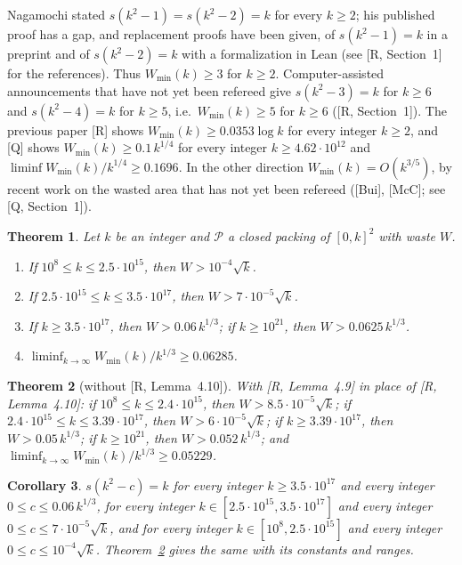 \documentclass[11pt]{amsart}
\newcommand{\cP}{\mathcal P}
\newcommand{\Wmin}{W_{\min}}
\newtheorem{theorem}{Theorem}[section]
\newtheorem{corollary}[theorem]{Corollary}
\theoremstyle{definition}
\theoremstyle{remark}
\numberwithin{equation}{section}
\begin{document}
Nagamochi stated $s(k^2-1)=s(k^2-2)=k$ for every $k\ge2$; his published proof has a gap, and replacement proofs have
been given, of $s(k^2-1)=k$ in a preprint and of $s(k^2-2)=k$ with a formalization in Lean (see [R, Section~1] for the
references). Thus $\Wmin(k)\ge3$ for $k\ge2$. Computer-assisted announcements that have not yet been refereed give
$s(k^2-3)=k$ for $k\ge6$ and $s(k^2-4)=k$ for $k\ge5$, i.e.\ $\Wmin(k)\ge5$ for $k\ge6$ ([R, Section~1]). The previous
paper [R] shows $\Wmin(k)\ge0.0353\log k$ for every integer $k\ge2$, and [Q] shows $\Wmin(k)\ge0.1\,k^{1/4}$
for every integer $k\ge4.62\cdot10^{12}$ and $\liminf\Wmin(k)/k^{1/4}\ge0.1696$. In the other direction
$\Wmin(k)=O(k^{3/5})$, by recent work on the wasted area that has not yet been refereed ([Bui], [McC]; see
[Q, Section~1]).

\begin{theorem}\label{thm:main}
Let $k$ be an integer and $\cP$ a closed packing of $[0,k]^2$ with waste $W$.
\begin{enumerate}[label=(\alph*)]
\item If $10^8\le k\le2.5\cdot10^{15}$, then $W>10^{-4}\sqrt k$.
\item If $2.5\cdot10^{15}\le k\le3.5\cdot10^{17}$, then $W>7\cdot10^{-5}\sqrt k$.
\item If $k\ge3.5\cdot10^{17}$, then $W>0.06\,k^{1/3}$; if $k\ge10^{21}$, then $W>0.0625\,k^{1/3}$.
\item $\liminf_{k\to\infty}\Wmin(k)/k^{1/3}\ge0.06285$.
\end{enumerate}
\end{theorem}

\begin{theorem}[without {[R, Lemma~4.10]}]\label{thm:main13}
With [R, Lemma~4.9] in place of [R, Lemma~4.10]: if $10^8\le k\le2.4\cdot10^{15}$, then $W>8.5\cdot10^{-5}\sqrt k$; if
$2.4\cdot10^{15}\le k\le3.39\cdot10^{17}$, then $W>6\cdot10^{-5}\sqrt k$; if $k\ge3.39\cdot10^{17}$, then
$W>0.05\,k^{1/3}$; if $k\ge10^{21}$, then $W>0.052\,k^{1/3}$; and $\liminf_{k\to\infty}\Wmin(k)/k^{1/3}\ge0.05229$.
\end{theorem}

\begin{corollary}\label{cor:s}
$s(k^2-c)=k$ for every integer $k\ge3.5\cdot10^{17}$ and every integer $0\le c\le0.06\,k^{1/3}$, for every integer
$k\in[2.5\cdot10^{15},3.5\cdot10^{17}]$ and every integer $0\le c\le7\cdot10^{-5}\sqrt k$, and for every integer
$k\in[10^8,2.5\cdot10^{15}]$ and every integer $0\le c\le10^{-4}\sqrt k$. Theorem~\ref{thm:main13} gives the same with
its constants and ranges.
\end{corollary}
\end{document}
